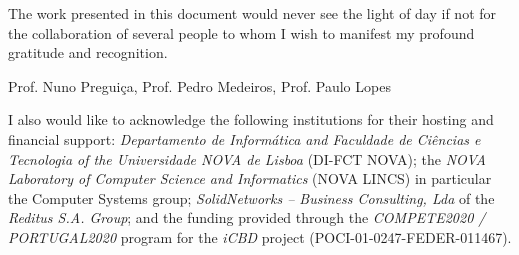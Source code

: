 \acknowledgements

The work presented in this document would never see the light of day if not for the collaboration of several people to whom I wish to manifest my profound gratitude and recognition.

Prof. Nuno Preguiça, Prof. Pedro Medeiros, Prof. Paulo Lopes


I also would like to acknowledge the following institutions for their hosting and financial support: \textit{Departamento de Informática and Faculdade de Ciências e Tecnologia of the Universidade NOVA de Lisboa} (DI-FCT NOVA); the \textit{NOVA Laboratory of Computer Science and Informatics} (NOVA LINCS) in particular the Computer Systems group; \textit{SolidNetworks – Business Consulting, Lda} of the \textit{Reditus S.A. Group}; and the funding provided through the \textit{COMPETE2020 / PORTUGAL2020} program for the \textit{iCBD} project (POCI-01-0247-FEDER-011467).